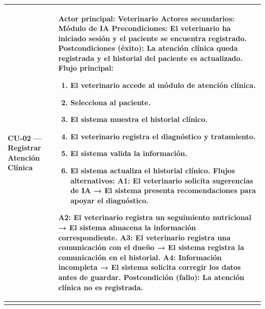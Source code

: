 \documentclass[
]{article}
\newcounter{none} %
\begin{document}
{\def\LTcaptype{none} %
\begin{longtable}[]{@{}
  >{\raggedright\arraybackslash}p{}
  >{\raggedright\arraybackslash}p{}@{}}
\toprule\noalign{}
\begin{minipage}[b]{\linewidth}\raggedright
\textbf{CU-02 --- Registrar Atención Clínica}
\end{minipage} & \begin{minipage}[b]{\linewidth}\raggedright
\textbf{Actor principal:} Veterinario \textbf{Actores secundarios:} Módulo de IA \textbf{Precondiciones:} El
veterinario ha iniciado sesión y el paciente se encuentra registrado. \textbf{Postcondiciones (éxito):} La atención clínica queda registrada y
el historial del paciente es actualizado. \textbf{Flujo principal:}

\begin{enumerate}
\def\labelenumi{\arabic{enumi}.}
\item
  El veterinario accede al módulo de atención clínica.
\item
  Selecciona al paciente.
\item
  El sistema muestra el historial clínico.
\item
  El veterinario registra el diagnóstico y tratamiento.
\item
  El sistema valida la información.
\item
  El sistema actualiza el historial clínico. \textbf{Flujos
  alternativos:} A1: El veterinario solicita sugerencias de IA → El
  sistema presenta recomendaciones para apoyar el diagnóstico.
\end{enumerate}

A2: El veterinario registra un seguimiento nutricional → El sistema almacena la información correspondiente. A3: El veterinario registra una comunicación con el dueño → El sistema
registra la comunicación en el historial. A4: Información incompleta → El sistema solicita corregir los datos
antes de guardar. \textbf{Postcondición (fallo):} La atención clínica no es registrada.
\end{minipage} \\
\midrule\noalign{}
\endhead
\bottomrule\noalign{}
\endlastfoot
\end{longtable}
}
\end{document}
